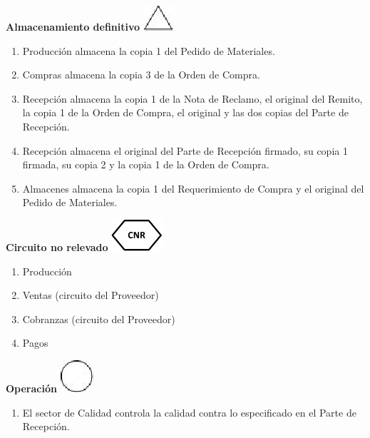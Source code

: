 \begin{center}
  \textbf{Almacenamiento definitivo}
  \includegraphics{./Images/Simbolos/simbolo-Almacenamiento-Definitivo.png}
\end{center}
\begin{enumerate}
  \item Producción almacena la copia 1 del Pedido de Materiales.
  \item Compras almacena la copia 3 de la Orden de Compra.
  \item Recepción almacena la copia 1 de la Nota de Reclamo, el original del Remito, la copia 1 de la Orden de Compra, el original y las dos copias del Parte de Recepción.
  \item Recepción almacena el original del Parte de Recepción firmado, su copia 1 firmada, su copia 2 y la copia 1 de la Orden de Compra.
  \item Almacenes almacena la copia 1 del Requerimiento de Compra y el original del Pedido de Materiales.
\end{enumerate}

\begin{center}
  \textbf{Circuito no relevado}
  \includegraphics{./Images/Simbolos/simbolo-CNR.png}
\end{center}
\begin{enumerate}
  \item Producción
  \item Ventas (circuito del Proveedor)
  \item Cobranzas (circuito del Proveedor)
  \item Pagos
\end{enumerate}

\begin{center}
  \textbf{Operación}
  \includegraphics{./Images/Simbolos/simbolo-Operacion.png}
\end{center}
\begin{enumerate}
  \item El sector de Calidad controla la calidad contra lo especificado en el Parte de Recepción.
\end{enumerate}

